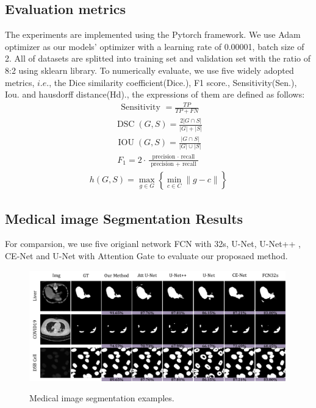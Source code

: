 \documentclass[UTF8]{article} %
\begin{document}
\subsection{Evaluation metrics}
The experiments are implemented using the Pytorch framework. We use Adam optimizer\cite{Adam} as our
models' optimizer with a learning rate of 0.00001, batch size of 2. All of datasets are splitted into training set and validation set with 
the ratio of 8:2 using sklearn library. To numerically evaluate, we use five widely adopted metrics, \(i.e.\),
the Dice similarity coefficient(Dice.), F1 score., Sensitivity(Sen.), Iou. and hausdorff distance(Hd)., the expressions of them are defined as follows:
\begin{align}
  \text { Sensitivity }=\frac{T P}{T P+F N}
\end{align}
\begin{align}
  \operatorname{DSC}(G, S)=\frac{2|G \cap S|}{|G|+|S|}
\end{align}
\begin{align}
  \operatorname{IOU}(G, S)=\frac{|G \cap S|}{|G| \cup|S|}
\end{align}
\begin{align}
  F_{1}=2 \cdot \frac{\text { precision } \cdot \text { recall }}{\text { precision }+\text { recall }}
\end{align}
\begin{align}
  h(G, S)=\max _{g \in G}\left\{\min _{c \in C}\|g-c\|\right\}
\end{align}
\subsection{Medical image Segmentation Results}
For comparsion, we use five origianl network FCN with 32s\cite{fcn}, U-Net\cite{unet}, U-Net++\cite{unet++} , CE-Net\cite{cenet} and U-Net with Attention Gate\cite{attentiongate}
to evaluate our proposaed method. 
\begin{figure}[ht]
  \begin{center}
  \includegraphics[width=0.99\textwidth]{result.pdf}
  \vspace{-2mm}
  \caption{Medical image segmentation examples.} 
  \vspace{-2mm}
  \label{fig:result}
  \end{center}
  \vspace{-0.35cm}
\end{figure}
\end{document}
